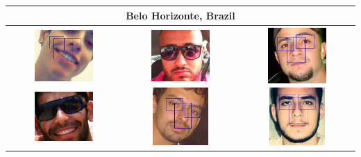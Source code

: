 \begin{table}[ht!]
\begin{center}
\begin{tabular}{c|c|c}
\midrule \multicolumn{3}{c}{Belo Horizonte, Brazil} \TBstrut \\ \midrule 
\includegraphics[height=2.2cm,width=2.2cm]{figures/results/detections/brazil/male/lq/e0e544f2-545c-41b1-98a0-cbb3aaaa76bf.jpeg}
\includegraphics[height=2.2cm,width=2.2cm]{figures/results/detections/brazil/male/lq/e3bb800b-cf52-4a85-9972-6b47c83f1c15.jpeg}
&
\includegraphics[height=2.2cm,width=2.2cm]{figures/results/detections/brazil/male/mq/27dd28de-d3d6-46d0-8e9e-4bb2fa6c7714.jpeg}
\includegraphics[height=2.2cm,width=2.2cm]{figures/results/detections/brazil/male/mq/7dfae586-af1b-4c07-9e00-d25f47f2c229.jpeg}
&
\includegraphics[height=2.2cm,width=2.2cm]{figures/results/detections/brazil/male/hq/ca4b442f-8d1a-486c-8d5b-9d7709a9849e.jpeg}
\includegraphics[height=2.2cm,width=2.2cm]{figures/results/detections/brazil/male/hq/06312eb0-93de-407c-85bf-4cddce28f47f.jpeg}
\TBstrut \\ 



\end{tabular}
\end{center}
\end{table}
